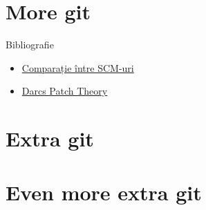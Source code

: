 \documentclass{beamer}
\begin{document}
\section{More git}

\begin{frame}{Bibliografie}
  \begin{itemize}
    \item \href{http://en.wikipedia.org/wiki/Comparison_of_revision_control_software}{Comparație între SCM-uri}
    \item \href{http://en.wikibooks.org/wiki/Understanding_Darcs/Patch_theory}{Darcs Patch Theory}
  \end{itemize}
\end{frame}

\section{Extra git}
\section{Even more extra git}


%
\end{document}
